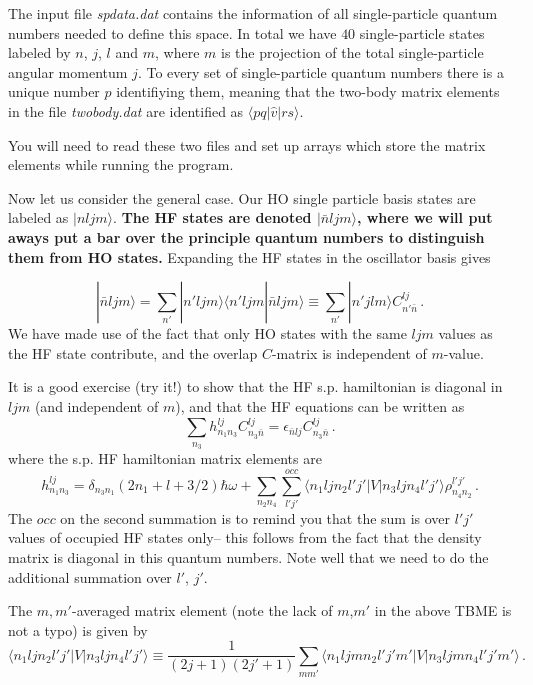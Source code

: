 \documentclass[11pt,a4wide]{article}
\begin{document}
The input file {\em spdata.dat} contains the information of all single-particle quantum numbers needed to define this space. In total we have $40$ single-particle states labeled by $n$, $j$, $l$ and $m$, where $m$ is the projection of the total single-particle angular momentum $j$. To every set of single-particle quantum numbers there is a unique number $p$ identifiying them, meaning that the two-body matrix elements in the file {\em twobody.dat} are identified as 
$\langle pq \vert \hat{v} | rs \rangle$.

You will need to read these two files and set up arrays which store the matrix elements while running the program.




Now let us consider the general case. Our HO single particle basis  states are labeled as $|nljm\rangle$.  {\bf The HF states are denoted $|\bar{n}ljm\rangle$, where we will put aways put a bar over the principle quantum numbers to distinguish them from HO states.}  Expanding the HF states in the oscillator basis gives

\begin{equation}
|\bar{n}ljm\rangle =\sum_{n'}|n'ljm\rangle\langle n'ljm|\bar{n}ljm\rangle \equiv \sum_{n'} |n'jlm\rangle C^{lj}_{n'\bar{n}} \,.
\end{equation}
We have made use of the fact that only HO states with the same $ljm$ values as the HF state contribute, and the overlap $C$-matrix is independent of $m$-value.  

It is a good exercise (try it!) to show that the HF s.p. hamiltonian is diagonal in $ljm$ (and independent of $m$), and that the HF equations can be written as
\begin{equation}
\sum_{n_3} h^{lj}_{n_1n_3}C^{lj}_{n_3\bar{n}} = \epsilon_{\bar{n}lj}C^{lj}_{n_3\bar{n}}\,.
\end{equation} 
 where the s.p. HF hamiltonian matrix elements are 
\begin{equation}
h^{lj}_{n_1n_3} = \delta_{n_3 n_1}(2n_1+l + 3/2)\hbar\omega + \sum_{n_2n_4}\sum_{l'j'}^{occ}\langle n_1ljn_2l'j'|V|n_3ljn_4l'j'\rangle\rho^{l'j'}_{n_4n_2}\,.
\end{equation}
The $occ$ on the second summation is to remind you that the sum is over $l'j'$ values of occupied HF states only-- this follows from the fact that the density matrix is diagonal in this quantum numbers. Note well that we need to do the additional summation over $l'$, $j'$.

The $m,m'$-averaged matrix element (note the lack of $m$,$m'$ in the above TBME is not a typo) is given by
\begin{equation}
\label{eq:mavgTBME}
\langle n_1ljn_2l'j'|V|n_3ljn_4l'j'\rangle \equiv \frac{1}{(2j+1)(2j'+1)}\sum_{mm'}  \langle n_1ljmn_2l'j'm'|V|n_3ljmn_4l'j'm'\rangle\,.
\end{equation}
\end{document}
